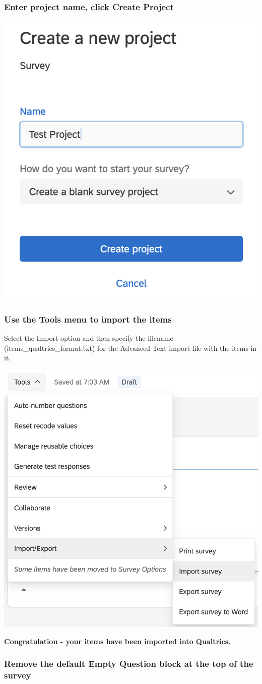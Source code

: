 \documentclass[
]{krantz}
\begin{document}
\hypertarget{enter-project-name-click-create-project}{%
\subsubsection{Enter project name, click Create Project}\label{enter-project-name-click-create-project}}

\includegraphics[width=0.4\linewidth]{ch_qualtrics/images/screenshot_b4}

\hypertarget{use-the-tools-menu-to-import-the-items}{%
\subsubsection{Use the Tools menu to import the items}\label{use-the-tools-menu-to-import-the-items}}

Select the Import option and then specify the filename (items\_qualtrics\_format.txt) for the Advanced Text import file with the items in it.

\includegraphics[width=0.5\linewidth]{ch_qualtrics/images/screenshot_b5}

\textbf{Congratulation - your items have been imported into Qualtrics.}

\hypertarget{remove-the-default-empty-question-block-at-the-top-of-the-survey}{%
\subsubsection{Remove the default Empty Question block at the top of the survey}\label{remove-the-default-empty-question-block-at-the-top-of-the-survey}}
\end{document}
